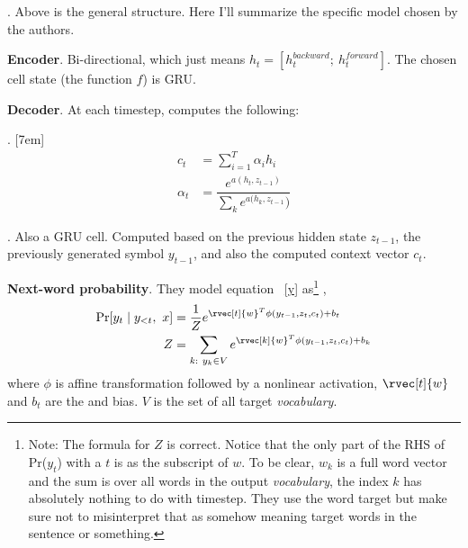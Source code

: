 \documentclass[11pt]{article}
\newcommand\myspace[1][]{\vspace{#1\bigskipamount}}
\newcommand\p{\Needspace{10\baselineskip} \noindent}
\begin{document}
\myspace
\p {}. Above is the general structure. Here I'll summarize the specific model chosen by the authors. 
\begin{compactitem}
	\item \textbf{Encoder}. Bi-directional, which just means $h_t = \left[h_t^{backward};~h_t^{forward} \right]$. The chosen cell state (the function $f$) is GRU.
	
	\item \textbf{Decoder}. At each timestep, computes the following:
	\begin{compactitem}[$\rightarrow$]
		\item {}. 
		\begin{align}
		c_t &= \sum_{i = 1}^{T} \alpha_i h_i \\
		\alpha_t &= \dfrac{e^{a(h_t, z_{t - 1})}}{\sum_k e^{a(h_k, z_{t - 1}})} 
		\end{align}
		\item {}. Also a GRU cell. Computed based on the previous hidden state $z_{t - 1}$, the previously generated symbol $y_{t - 1}$, and also the computed context vector $c_t$. 
	\end{compactitem}
	
	\item \textbf{Next-word probability}. They model equation ~\ref{y} as\footnote{Note: The formula for $Z$ is correct. Notice that the only part of the RHS of Pr($y_t$) with a $t$ is as the subscript of $w$. To be clear, $w_k$ is a full word vector and the sum is over all words in the output \textit{vocabulary}, the index $k$ has absolutely nothing to do with timestep. They use the word target but make sure not to misinterpret that as somehow meaning target words in the sentence or something.} ,
	\begin{align}
	\Pr[y_t \mid y_{<t}, ~ x]  &= \frac{1}{Z} e^{\rvec[t]{w}^T \phi(y_{t - 1}, z_t, c_t) + b_t} \\
	Z &= \sum_{k:~y_k\in V}    e^{\rvec[k]{w}^T \phi(y_{t - 1}, z_t, c_t) + b_k}
	\end{align}
	where $\phi$ is affine transformation followed by a nonlinear activation, $\rvec[t]{w}$ and $b_t$ are the  and bias. $V$ is the set of all target \textit{vocabulary}. 
\end{compactitem}
\end{document}
